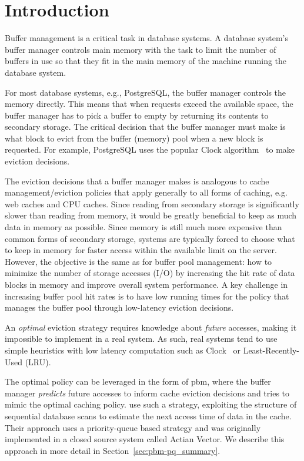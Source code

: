 \chapter{Introduction}


Buffer management is a critical task in database systems.  A database system's buffer manager controls main memory with the task to limit the number of buffers in use so that they fit in the main memory of the machine running the database system.

For most database systems, e.g., PostgreSQL, the buffer manager controls the memory directly.  This means that when requests exceed the available space, the buffer manager has to pick a buffer to empty by returning its contents to secondary storage.  The critical decision that the buffer manager must make is what block to evict from the buffer (memory) pool when a new block is requested.  For example, PostgreSQL uses the popular Clock algorithm~\cite{pg_buf_readme} to make eviction decisions. %

The eviction decisions that a buffer manager makes is analogous to cache management/eviction policies that apply generally to all forms of caching, e.g. web caches and CPU caches.  Since reading from secondary storage is significantly slower than reading from memory, it would be greatly beneficial to keep as much data in memory as possible.  Since memory is still much more expensive than common forms of secondary storage, systems are typically forced to choose what to keep in memory for faster access within the available limit on the server.  However, the objective is the same as for buffer pool management: how to minimize the number of storage accesses (I/O) by increasing the hit rate of data blocks in memory and improve overall system performance.
A key challenge in increasing buffer pool hit rates is to have low running times for the policy that manages the buffer pool through low-latency eviction decisions.

An \textit{optimal} eviction strategy requires knowledge about \textit{future} accesses, making it impossible to implement in a real system. As such, real systems tend to use simple heuristics with low latency computation such as Clock~\cite{gclock} or Least-Recently-Used (LRU).

The optimal policy can be leveraged in the form of \gls{pbm}, where the buffer manager \textit{predicts} future accesses to inform cache eviction decisions and tries to mimic the optimal caching policy. \citet{pbm} use such a strategy, exploiting the structure of sequential database scans to estimate the next access time of data in the cache. Their approach uses a priority-queue based strategy and was originally implemented in a closed source system called Actian Vector. We describe this approach in more detail in Section~\ref{sec:pbm-pq_summary}.

